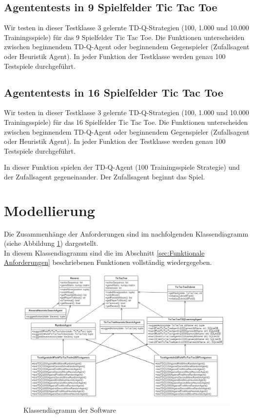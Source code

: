 \subsection{Agententests in 9 Spielfelder Tic Tac Toe}
Wir testen in dieser Testklasse 3 gelernte TD-Q-Strategien (100, 1.000 und 10.000 Trainingsspiele) für das 9 Spielfelder Tic Tac Toe. Die Funktionen unterscheiden zwischen beginnendem TD-Q-Agent oder beginnendem Gegenspieler (Zufallsagent oder Heuristik Agent). In jeder Funktion der Testklasse werden genau 100 Testspiele durchgeführt.

\subsection{Agententests in 16 Spielfelder Tic Tac Toe}
Wir testen in dieser Testklasse 3 gelernte TD-Q-Strategien (100, 1.000 und 10.000 Trainingsspiele) für das 16 Spielfelder Tic Tac Toe. Die Funktionen unterscheiden zwischen beginnendem TD-Q-Agent oder beginnendem Gegenspieler (Zufallsagent oder Heuristik Agent). In jeder Funktion der Testklasse werden genau 100 Testspiele durchgeführt.

In dieser Funktion spielen der TD-Q-Agent (100 Trainingsspiele Strategie) und der Zufallsagent gegeneinander. Der Zufallsagent beginnt das Spiel.


\section{Modellierung}
Die Zusammenhänge der Anforderungen sind im nachfolgenden Klassendiagramm (siehe Abbildung \ref{fig:klassendiagramm}) dargestellt. \\

In diesem Klassendiagramm sind die im Abschnitt \ref{sec:Funktionale Anforderungen} beschriebenen Funktionen vollständig  wiedergegeben. \\

\begin{figure}[!htbp]
  \centering
  \includegraphics[angle = 90, scale = 0.5]{inhalt/abbildungen/projectClassDiagram.jpg}
  \caption{Klassendiagramm der Software}
  \label{fig:klassendiagramm}
\end{figure} 
